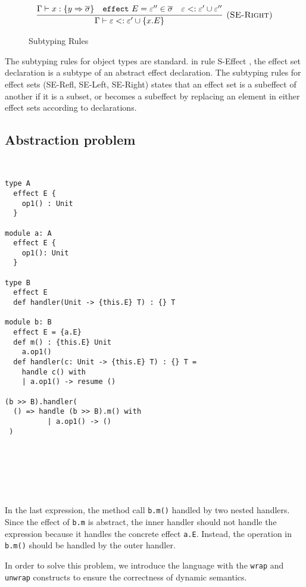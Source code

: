 \documentclass{article}
\newcommand{\keywadj}[1]{\mathtt{#1}}
\newcommand{\keyw}[1]{\keywadj{#1}~}
\begin{document}
\begin{figure}[H]
{\[\begin{array}{c}
\infer[\textsc{(SE-Right)}]
  {\Gamma \vdash \varepsilon <: \varepsilon' \cup \{x.E\}}
  {\Gamma \vdash x : \{y \Rightarrow \overline{\sigma}\} & \keyw{effect} E = \varepsilon'' \in \overline{\sigma} & \varepsilon  <: \varepsilon' \cup \varepsilon''  } 
  
  
\end{array}
\]

}
\caption{Subtyping Rules}
\end{figure}

The subtyping rules for object types are standard. in rule S-Effect , the effect set declaration is a subtype of an abstract effect declaration. The subtyping rules for effect sets (SE-Refl, SE-Left, SE-Right) states that an effect set is a subeffect of another if it is a subset, or becomes a subeffect by replacing an element in either effect sets according to declarations.

\pagebreak
\subsection{Abstraction problem}
\begin{verbatim}


type A
  effect E {
    op1() : Unit
  }
  
module a: A
  effect E {
    op1(): Unit
  }

type B
  effect E 
  def handler(Unit -> {this.E} T) : {} T
  
module b: B
  effect E = {a.E}
  def m() : {this.E} Unit
    a.op1()
  def handler(c: Unit -> {this.E} T) : {} T = 
    handle c() with
    | a.op1() -> resume ()

(b >> B).handler(
  () => handle (b >> B).m() with
          | a.op1() -> ()
 )

 
 
 
 
 
\end{verbatim}

In the last expression, the method call \texttt{b.m()} handled by two nested handlers. Since the effect of \texttt{b.m} is abstract, the inner handler should not handle the expression because it handles the concrete effect \texttt{a.E}. Instead, the operation in \texttt{b.m()} should be handled by the outer handler.

In order to solve this problem, we introduce the language with the \texttt{wrap} and \texttt{unwrap} constructs to ensure the correctness of dynamic semantics.


\pagebreak
\end{document}
